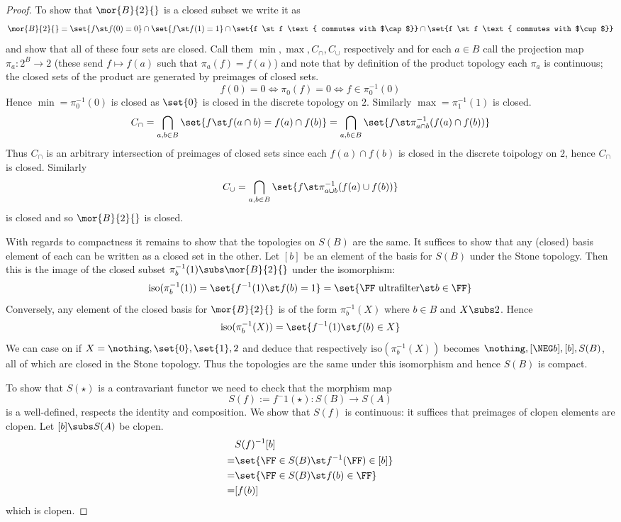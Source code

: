 \begin{proof}
    To show that $\mor{B}{2}{}$ is a closed subset we write it as 
    \[\mor{B}{2}{} = \set{f \st f(0) = 0} \cap \set{f \st f(1) = 1}
        \cap \set{f \st f \text{ commutes with $\cap$}} \cap 
        \set{f \st f \text{ commutes with $\cup$}}\]
    and show that all of these four sets are closed.
    Call them $\min,\max,C_{\cap},C_\cup$ respectively and for each $a \in B$
    call the projection map $\pi_a : 2^B \to 2$ (these send $f \mapsto f(a)$
    such that $\pi_a(f) = f(a)$)
    and note that by definition of the product topology each 
    $\pi_a$ is continuous; 
    the closed sets of the product are generated by preimages of closed sets.
    \[f(0) = 0 \iff \pi_0(f) = 0 \iff f \in \pi_0^{-1}(0)\]
    Hence $\min = \pi_0^{-1}(0)$ is closed as $\set{0}$ 
    is closed in the discrete topology on $2$.
    Similarly $\max = \pi_1^{-1}(1)$ is closed.
    \[C_\cap = \bigcap_{a,b \in B} \set{f \st f(a \cap b) = f(a) \cap f(b)}
    = \bigcap_{a,b \in B} \set{f \st \pi_{a \cap b}^{-1}(f(a) \cap f(b))}\]
    Thus $C_\cap$ is an arbitrary intersection of preimages of closed sets 
    since each ${f(a) \cap f(b)}$ is closed in the discrete toipology on $2$,
    hence $C_\cap$ is closed. 
    Similarly 
    \[C_\cup = \bigcap_{a,b \in B} 
    \set{f \st \pi_{a \cup b}^{-1}(f(a) \cup f(b))}\]
    is closed and so $\mor{B}{2}{}$ is closed.

    With regards to compactness it remains to show that the topologies 
    on $S(B)$ are the same.
    It suffices to show that any (closed) basis element of each can be written 
    as a closed set in the other.
    Let $[b]$ be an element of the basis for $S(B)$ under the Stone topology.
    Then this is the image of the closed subset 
    $\pi_b^{-1}(1) \subs \mor{B}{2}{}$ under the isomorphism:
    \[\mathrm{iso}(\pi_b^{-1}(1)) = \set{f^{-1}(1) \st f(b) = 1}
    = \set{\FF \text{ ultrafilter} \st b \in \FF}\]
    Conversely, 
    any element of the closed basis for $\mor{B}{2}{}$ is of the form 
    $\pi_b^{-1}(X)$ where $b \in B$ and $X \subs 2$.
    Hence 
    \[\mathrm{iso}(\pi_b^{-1}(X)) = \set{f^{-1}(1) \st f(b) \in X}\]
    We can case on if $X = \nothing, \set{0}, \set{1}, 2$ and deduce that 
    respectively $\mathrm{iso}(\pi_b^{-1}(X))$ 
    becomes $\nothing, [\NEG b], [b], S(B)$, 
    all of which are closed in the Stone topology.
    Thus the topologies are the same under this isomorphism and hence 
    $S(B)$ is compact.

    To show that $S(\star)$ 
    is a contravariant functor we need to check that the morphism map
    \[S(f) := f^-1(\star) : S(B) \to S(A)\]
    is a well-defined, respects the identity and composition. 
    We show that $S(f)$ is continuous: 
    it suffices that preimages of clopen elements are clopen.
    Let $[b] \subs S(A)$ be clopen. 
    \begin{align*}
        & S(f)^{-1}[b]\\
        =& \set{\FF \in S(B) \st f^{-1}(\FF) \in [b]}\\
        =& \set{\FF \in S(B) \st f(b) \in \FF}\\
        =& [f(b)]
    \end{align*}
    which is clopen.
\end{proof}

